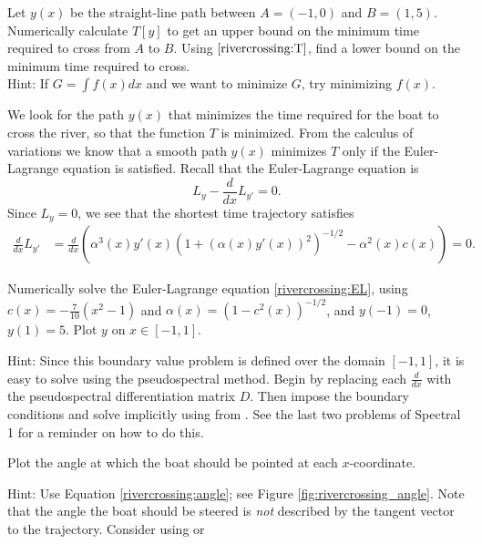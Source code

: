 \begin{problem}
	Let $y(x)$ be the straight-line path between $A = (-1,0)$ and $B=(1,5)$. Numerically calculate $T[y]$ to get an upper bound on the minimum time required to cross from $A$ to $B$. Using $\eqref{rivercrossing:T}$, find a lower bound on the minimum time required to cross.
	\\Hint: If $G=\int f(x)dx$ and we want to minimize $G$, try minimizing $f(x)$.
\end{problem}

We look for the path $y(x)$ that minimizes the time required for the boat to cross the river, so that the function $T$ is minimized. From the calculus of variations we know that a smooth path $y(x)$ minimizes $T$ only if the Euler-Lagrange equation is satisfied. Recall that the Euler-Lagrange equation is 
\[
L_{y} - \frac{d}{dx}L_{y'} = 0.
\]
Since $L_y = 0$, we see that the shortest time trajectory satisfies
\begin{align}
	\frac{d}{dx}L_{y'} &=  \frac{d}{dx}\left( \alpha^3(x) y'(x) (1 + (\alpha(x) y'(x))^2)^{-1/2} - \alpha^2(x) c(x) \right) = 0.
	\label{rivercrossing:EL}
\end{align}

\begin{problem}
Numerically solve the Euler-Lagrange equation \eqref{rivercrossing:EL}, using $c(x) = -\frac{7}{10}(x^2-1)$ and $\alpha(x) = (1-c^2(x))^{-1/2}$, and $y(-1) = 0$, $y(1) = 5$. Plot $y$ on $x\in [-1,1]$.

Hint: Since this boundary value problem is defined over the domain $[-1,1]$, it is easy to solve using the pseudospectral method. Begin by replacing each $\frac{d}{dx}$ with the pseudospectral differentiation matrix $D$. Then impose the boundary conditions and solve implicitly using  from . See the last two problems of Spectral 1 for a reminder on how to do this.
\end{problem}

\begin{problem}
Plot the angle at which the boat should be pointed at each $x$-coordinate. 

Hint: Use  Equation \eqref{rivercrossing:angle}; see Figure \ref{fig:rivercrossing_angle}. Note that the angle the boat should be steered is \emph{not} described by the tangent vector to the trajectory. Consider using  or 
\end{problem}

